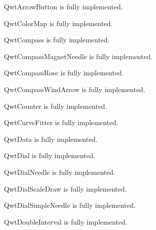 \documentclass{manual}
\begin{document}
\begin{classdesc*}{QwtArrowButton}
  is fully implemented.
\end{classdesc*}

\begin{classdesc*}{QwtColorMap}
  is fully implemented.
\end{classdesc*}

\begin{classdesc*}{QwtCompass}
  is fully implemented.
\end{classdesc*}

\begin{classdesc*}{QwtCompassMagnetNeedle}
  is fully implemented.
\end{classdesc*}

\begin{classdesc*}{QwtCompassRose}
  is fully implemented.
\end{classdesc*}

\begin{classdesc*}{QwtCompassWindArrow}
  is fully implemented.
\end{classdesc*}

\begin{classdesc*}{QwtCounter}
  is fully implemented.
\end{classdesc*}

\begin{classdesc*}{QwtCurveFitter}
  is fully implemented.
\end{classdesc*}

\begin{classdesc*}{QwtData}
  is fully implemented.
\end{classdesc*}

\begin{classdesc*}{QwtDial}
  is fully implemented.
\end{classdesc*}

\begin{classdesc*}{QwtDialNeedle}
  is fully implemented.
\end{classdesc*}

\begin{classdesc*}{QwtDialScaleDraw}
  is fully implemented.
\end{classdesc*}

\begin{classdesc*}{QwtDialSimpleNeedle}
  is fully implemented.
\end{classdesc*}

\begin{classdesc*}{QwtDoubleInterval}
  is fully implemented.
\end{classdesc*}
\end{document}
